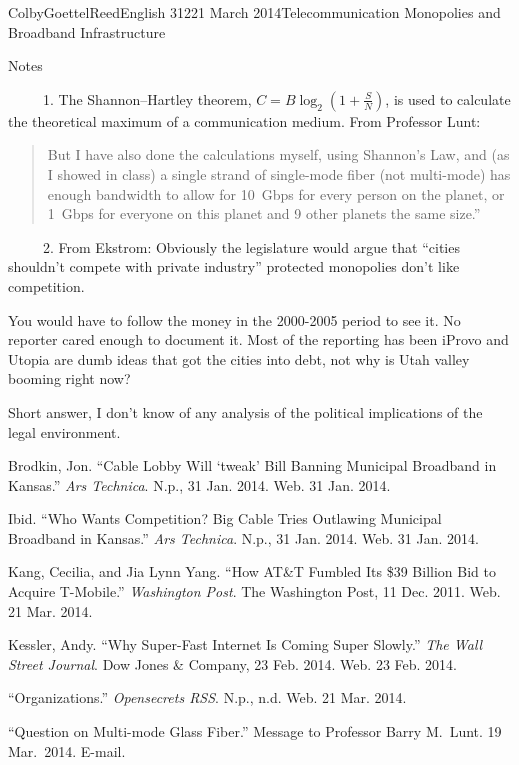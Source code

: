 \documentclass[12pt]{article}
\begin{document}
\begin{mla}{Colby}{Goettel}{Reed}{English 312}{21 March 2014}{Telecommunication Monopolies and Broadband Infrastructure}
\newpage
\begin{center}
    Notes
\end{center}
\ \ \ \ \ 1. The Shannon--Hartley theorem, $C=B\log_2\left(1+\frac{S}{N}\right)$, is used to calculate the theoretical maximum of a communication medium. From Professor Lunt:
\begin{quote}
    But I have also done the calculations myself, using Shannon's Law, and (as I showed in class) a single strand of single-mode fiber (not multi-mode) has enough bandwidth to allow for 10~Gbps for every person on the planet, or 1~Gbps for everyone on this planet and 9 other planets the same size.''
\end{quote}

{\noindent\ \ \ \ \ 2. From Ekstrom:}
Obviously the legislature would argue that ``cities shouldn't compete with private industry'' protected monopolies don't like competition.

You would have to follow the money in the 2000-2005 period to see it. No reporter cared enough to document it. Most of the reporting has been iProvo and Utopia are dumb ideas that got the cities into debt, not why is Utah valley booming right now?

Short answer, I don't know of any analysis of the political implications of the legal environment.

\begin{workscited}
    \bibent Brodkin, Jon. ``Cable Lobby Will `tweak' Bill Banning Municipal Broadband in Kansas.'' \textit{Ars Technica}. N.p., 31 Jan. 2014. Web. 31 Jan. 2014.
    
    \bibent Ibid. ``Who Wants Competition? Big Cable Tries Outlawing Municipal Broadband in Kansas.'' \textit{Ars Technica}. N.p., 31 Jan. 2014. Web. 31 Jan. 2014.
    
    \bibent Kang, Cecilia, and Jia Lynn Yang. ``How AT\&T Fumbled Its \$39 Billion Bid to Acquire T-Mobile.'' \textit{Washington Post}. The Washington Post, 11 Dec. 2011. Web. 21 Mar. 2014.
    
    \bibent Kessler, Andy. ``Why Super-Fast Internet Is Coming Super Slowly.'' \textit{The Wall Street Journal}. Dow Jones \& Company, 23 Feb. 2014. Web. 23 Feb. 2014.
    
    \bibent ``Organizations.'' \textit{Opensecrets RSS}. N.p., n.d. Web. 21 Mar. 2014.
    
    \bibent ``Question on Multi-mode Glass Fiber.'' Message to Professor Barry M.\ Lunt. 19 Mar.\ 2014. E-mail.
    

\end{workscited}
\end{mla}
\end{document}
